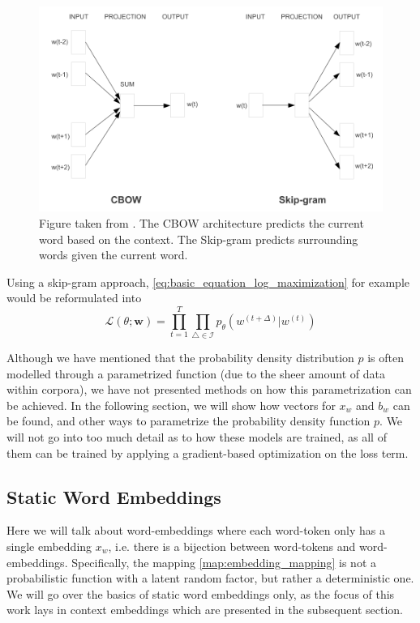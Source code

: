 \documentclass[a4paper,12pt,twoside,openright]{report}
\begin{document}
\begin{figure}[h]
	\center
  \includegraphics[width=0.6\linewidth]{./assets/background/cbow_and_skipgram.png}
  \caption{Figure taken from \cite{mikolov13}. The CBOW architecture predicts the current word based on the context. The Skip-gram predicts surrounding words given the current word.}
  \label{fig:cbow_skipgram}
\end{figure}

Using a skip-gram approach, \eqref{eq:basic_equation_log_maximization} for example would be reformulated into 
\begin{equation}
\mathcal{L}(\theta ; \mathbf{w})=\prod_{t=1}^{T} \prod_{\triangle \in \mathcal{I}} p_{\theta}\left(w^{(t +\Delta)} | w^{(t)}\right)
\end{equation}{\label{eq:basic_equation_log_maximization_skipgram}}

Although we have mentioned that the probability density distribution $p$ is often modelled through a parametrized function (due to the sheer amount of data within corpora), we have not presented methods on how this parametrization can be achieved.
In the following section, we will show how vectors for $x_w$ and $b_w$ can be found, and other ways to parametrize the probability density function $p$.
We will not go into too much detail as to how these models are trained, as all of them can be trained by applying a gradient-based optimization on the loss term.

\newpage
\subsection{Static Word Embeddings}

Here we will talk about word-embeddings where each word-token only has a single embedding $x_w$, i.e. there is a bijection between word-tokens and word-embeddings. 
Specifically, the mapping \eqref{map:embedding_mapping} is not a probabilistic function with a latent random factor, but rather a deterministic one.
We will go over the basics of static word embeddings only, as the focus of this work lays in context embeddings which are presented in the subsequent section.
\end{document}
